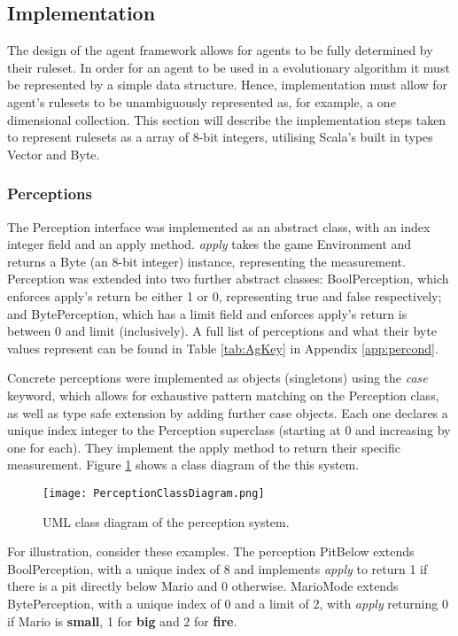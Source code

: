 \subsection{Implementation}

The design of the agent framework allows for agents to be fully determined by their ruleset. In order for an agent to be used in a evolutionary algorithm it must be represented by a simple data structure. Hence, implementation must allow for agent's rulesets to be unambiguously represented as, for example, a one dimensional collection. This section will describe the implementation steps taken to represent rulesets as a array of 8-bit integers, utilising Scala's built in types Vector and Byte.

\subsubsection{Perceptions}

The Perception interface was implemented as an abstract class, with an index integer field and an apply method. \emph{apply} takes the game Environment and returns a Byte (an 8-bit integer) instance, representing the measurement. Perception was extended into two further abstract classes: BoolPerception, which enforces apply's return be either 1 or 0, representing true and false respectively; and BytePerception, which has a limit field and enforces apply's return is between 0 and limit (inclusively). A full list of perceptions and what their byte values represent can be found in Table \ref{tab:AgKey} in Appendix \ref{app:percond}.

Concrete perceptions were implemented as objects (singletons) using the \emph{case} keyword, which allows for exhaustive pattern matching on the Perception class, as well as type safe extension by adding further case objects. Each one declares a unique index integer to the Perception superclass (starting at 0 and increasing by one for each). They implement the apply method to return their specific measurement. Figure \ref{fig:percumlcd} shows a class diagram of the this system.

\begin{figure}[t]
	\centering
	\texttt{[image: PerceptionClassDiagram.png]}
	\caption{UML class diagram of the perception system.}
	\label{fig:percumlcd}
\end{figure}

For illustration, consider these examples. The perception PitBelow extends BoolPerception, with a unique index of 8 and implements \emph{apply} to return 1 if there is a pit directly below Mario and 0 otherwise. MarioMode extends BytePerception, with a unique index of 0 and a limit of 2, with \emph{apply} returning 0 if Mario is \textbf{small}, 1 for \textbf{big} and 2 for \textbf{fire}.

